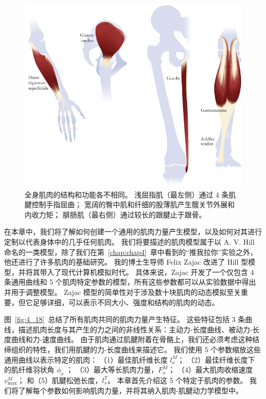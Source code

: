 \begin{figure}[!htb]
	\centering
	\includegraphics[width=1.0\linewidth]{chap5/5_1}
	\caption{全身肌肉的结构和功能各不相同。
		浅屈指肌（最左侧）通过 4 条肌腱控制手指屈曲；
		宽阔的臀中肌和纤细的股薄肌产生髋关节外展和内收力矩；
		腓肠肌（最右侧）通过较长的跟腱止于跟骨。 \label{fig:5_1}}
\end{figure}


在本章中，我们将了解如何创建一个通用的肌肉力量产生模型，以及如何对其进行定制以代表身体中的几乎任何肌肉。
我们将要描述的肌肉模型属于以 A. V. Hill 命名的一类模型，除了我们在第~\ref{chap:chap4}~章中看到的“推我拉你”实验之外，他还进行了许多肌肉的基础研究。
我的博士生导师 Felix Zajac 改进了 Hill 型模型，并将其带入了现代计算机模拟时代\cite{zajac1989muscle}。
具体来说，Zajac 开发了一个仅包含 4 条通用曲线和 5 个肌肉特定参数的模型，所有这些参数都可以从实验数据中得出并用于调整模型。
Zajac 模型的简单性对于涉及数十块肌肉的动态模拟至关重要，但它足够详细，可以表示不同大小、强度和结构的肌肉的动态。


图~\ref{fig:4_18}~总结了所有肌肉共同的肌肉力量产生特征。
这些特征包括 3 条曲线，描述肌肉长度与其产生的力之间的非线性关系：主动力-长度曲线、被动力-长度曲线和力-速度曲线。
由于肌肉通过肌腱附着在骨骼上，我们还必须考虑这种结缔组织的特性，我们用肌腱的力-长度曲线来描述它。
我们使用 5 个参数缩放这些通用曲线以表示特定的肌肉：
（1）最佳肌纤维长度 $l_o^M$；
（2）最佳纤维长度下的肌纤维羽状角 $\phi_o$ ；
（3）最大等长肌肉力量，$F_o^M$；
（4）最大肌肉收缩速度 $v_\text{max}^M$；
和（5）肌腱松弛长度，$l_s^T$。
本章首先介绍这 5 个特定于肌肉的参数。
我们将了解每个参数如何影响肌肉力量，并将其纳入肌肉-肌腱动力学模型中。



